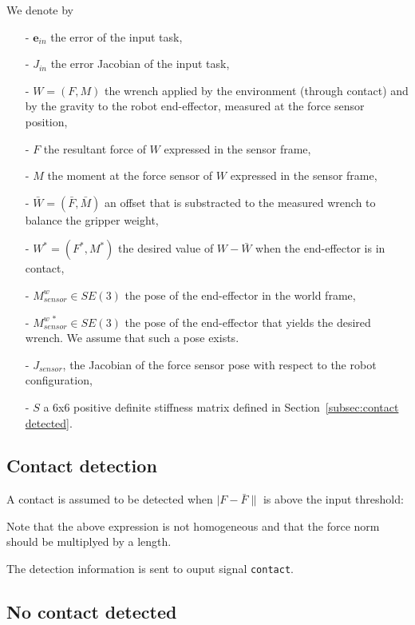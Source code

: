 \documentclass{article}
\newcommand{\oM}[2]{M^{#1}_{#2}}
\newcommand\wrench{W}
\newcommand\resultant{F}
\newcommand\moment{M}
\newcommand\wrenchdes{W^{*}}
\newcommand\wrenchOffset{\bar{W}}
\newcommand\resultantdes{F^{*}}
\newcommand\resultantOffset{\bar{F}}
\newcommand\momentdes{M^{*}}
\newcommand\momentOffset{\bar{M}}
\newcommand\error{\mathbf{e}}
\begin{document}
We denote by
\begin{itemize}
\item [-] $\error_{in}$ the error of the input task,
\item [-] $J_{in}$ the error Jacobian of the input task,
\item[-] $\wrench = (\resultant, \moment)$ the wrench applied by the environment (through contact) and by the gravity to the robot end-effector, measured at the force sensor position,
\item[-] $\resultant$ the resultant force of $\wrench$ expressed in the sensor frame,
\item[-] $\moment$ the moment at the force sensor of $\wrench$ expressed in the sensor frame,
\item[-] $\wrenchOffset = (\resultantOffset,\momentOffset)$ an offset that is substracted to the measured wrench to balance the gripper weight,
\item[-] $\wrenchdes = (\resultantdes, \momentdes)$ the desired value of $\wrench-\wrenchOffset$ when the end-effector is in contact,
\item[-] $\oM{w}{sensor}\in SE(3)$ the pose of the end-effector in the world frame,
\item[-] $\oM{w\ *}{sensor}\in SE(3)$ the pose of the end-effector that yields the desired wrench. We assume that such a pose exists.
\item[-] $J_{sensor}$, the Jacobian of the force sensor pose with respect to the
  robot configuration,
\item[-] $S$ a 6x6 positive definite stiffness matrix defined in Section~\ref{subsec:contact detected}.
\end{itemize}

\subsection{Contact detection}

A contact is assumed to be detected when $|\resultant - \resultantOffset\|$ is above the input threshold:

Note that the above expression is not homogeneous and that the force norm should
be multiplyed by a length.

The detection information is sent to ouput signal \texttt{contact}.

\subsection{No contact detected}
\end{document}
